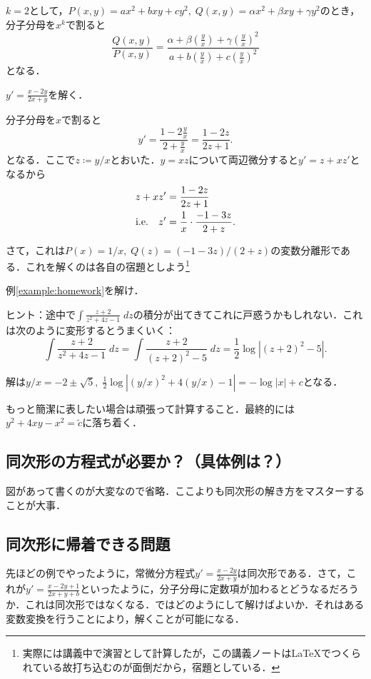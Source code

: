 \begin{example}[$k=2$]
    $k=2$として，$P(x,y)=ax^2+bxy+cy^2, \; Q(x,y)=\alpha x^2 + \beta xy + \gamma y^2$のとき，分子分母を$x^k$で割ると
    \[ \frac{Q(x,y)}{P(x,y)} = \frac{\alpha + \beta (\frac{y}{x}) + \gamma (\frac{y}{x})^2}{a + b (\frac{y}{x}) + c (\frac{y}{x})^2}\]
    となる．
\end{example}

\begin{example} \label{example:homework}
    $y'=\frac{x-2y}{2x+y}$を解く．

    分子分母を$x$で割ると
    \[ y' = \frac{1-2\frac{y}{x}}{2+\frac{y}{x}} = \frac{1-2z}{2z+1}.\]
    となる．ここで$z \coloneqq y/x$とおいた．$y=xz$について両辺微分すると$y'=z+xz'$となるから
    \begin{align*}
        z+xz' &= \frac{1-2z}{2z+1} \\
        \text{i.e.} \quad z' &= \frac{1}{x} \cdot \frac{-1-3z}{2+z}.
    \end{align*}

    さて，これは$P(x)=1/x, \; Q(z) = (-1-3z)/(2+z)$の変数分離形である．これを解くのは各自の宿題としよう\footnote{実際には講義中で演習として計算したが，この講義ノートは\LaTeX でつくられている故打ち込むのが面倒だから，宿題としている．}
\end{example}

\begin{homework*}
    例\ref{example:homework}を解け．
    
    ヒント：途中で$\int \frac{z+2}{z^2+4z-1} \; dz$の積分が出てきてこれに戸惑うかもしれない．これは次のように変形するとうまくいく：
    \[ \int \frac{z+2}{z^2+4z-1} \; dz = \int \frac{z+2}{(z+2)^2-5} \; dz = \frac{1}{2}\log |(z+2)^2-5|. \]

    解は$y/x=-2\pm \sqrt{5}, \; \frac{1}{2}\log|(y/x)^2+4(y/x)-1|=- \log|x| + c$となる．

    もっと簡潔に表したい場合は頑張って計算すること．最終的には$y^2+4xy-x^2=\tilde{c}$に落ち着く．
\end{homework*}

\subsection{同次形の方程式が必要か？（具体例は？）}
図があって書くのが大変なので省略．ここよりも同次形の解き方をマスターすることが大事．

\subsection{同次形に帰着できる問題}
先ほどの例でやったように，常微分方程式$y'=\frac{x-2y}{2x+y}$は同次形である．さて，これが$y'=\frac{x-2y+1}{2x+y+b}$といったように，分子分母に定数項が加わるとどうなるだろうか．これは同次形ではなくなる．ではどのようにして解けばよいか．それはある変数変換を行うことにより，解くことが可能になる．

